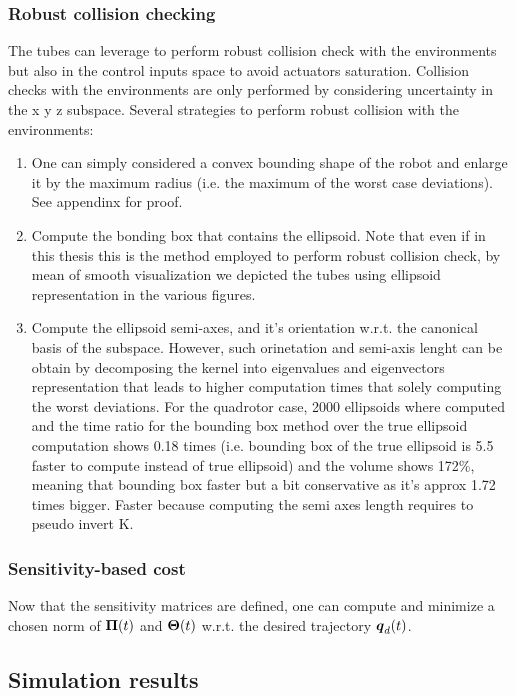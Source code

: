 \subsubsection{Robust collision checking}
The tubes can leverage to perform robust collision check with the environments but also in the control inputs space to avoid actuators saturation. 
Collision checks with the environments are only performed by considering uncertainty in the x y z subspace.
Several strategies to perform robust collision with the environments:
\begin{enumerate}
    \item One can simply considered a convex bounding shape of the robot and enlarge it by the maximum radius (i.e. the maximum of the worst case deviations). See appendinx for proof.
    \item Compute the bonding box that contains the ellipsoid. Note that even if in this thesis this is the method employed to perform robust collision check, by mean of smooth visualization we depicted the tubes using ellipsoid representation in the various figures.
    \item Compute the ellipsoid semi-axes, and it's orientation w.r.t. the canonical basis of the subspace. However, such orinetation and semi-axis lenght can be obtain by decomposing the kernel into eigenvalues and eigenvectors representation that leads to higher computation times that solely computing the worst deviations. For the quadrotor case, 2000 ellipsoids where computed and the time ratio for the bounding box method over the true ellipsoid computation shows 0.18 times (i.e. bounding box of the true ellipsoid is 5.5 faster to compute instead of true ellipsoid) and the volume shows 172\%, meaning that bounding box faster but a bit conservative as it's approx 1.72 times bigger. Faster because computing the semi axes length requires to pseudo invert K.
\end{enumerate}

\subsubsection{Sensitivity-based cost}
Now that the sensitivity matrices are defined, one can compute and minimize a chosen norm of $\boldsymbol{\Pi}(t)$ and $\boldsymbol{\Theta}(t)$ w.r.t. the desired trajectory $\boldsymbol{q}_d(t)$.

\subsection{Simulation results}
